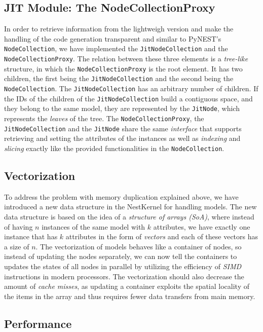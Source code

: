 \subsection*{JIT Module: The NodeCollectionProxy}

In order to retrieve information from the lightweigh version and make the handling of the code generation transparent and similar to PyNEST's \texttt{NodeCollection}, we have implemented the \texttt{JitNodeCollection} and the \texttt{NodeCollectionProxy}. The relation between these three elements is a \emph{tree-like} structure, in which the \texttt{NodeCollectionProxy} is the root element. It has two children, the first being the \texttt{JitNodeCollection} and the second being the \texttt{NodeCollection}. The \texttt{JitNodeCollection} has an arbitrary  number of children. If the IDs of the children of the \texttt{JitNodeCollection} build a contiguous space, and they belong to the same model, they are represented by the \texttt{JitNode}, which represents the \emph{leaves} of the tree. The \texttt{NodeCollectionProxy}, the \texttt{JitNodeCollection} and the \texttt{JitNode} share the same \emph{interface} that supports retrieving and setting the attributes of the instances as well as \emph{indexing} and \emph{slicing} exactly like the provided functionalities in the \texttt{NodeCollection}.

\subsection*{Vectorization}

To address the problem with memory duplication explained above, we have introduced a new data structure in the NestKernel for handling models. The new data structure is based on the idea of a \emph{structure of arrays (SoA)}, where instead of having $n$ instances of the same model with $k$ attributes, we have exactly one instance that has $k$ attributes in the form of \emph{vectors} and each of these vectors has a size of $n$. The vectorization of models behaves like a container of nodes, so instead of updating the nodes separately, we can now tell the containers to updates the states of all nodes in parallel by utilizing the efficiency of \emph{SIMD} instructions in modern processors. The vectorization should also decrease the amount of \emph{cache misses}, as updating a container exploits the spatial locality of the items in the array and thus requires fewer data transfers from main memory.

\subsection*{Performance}

